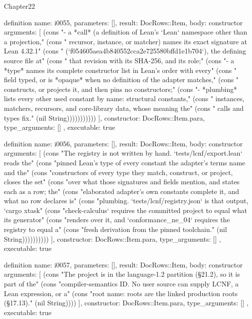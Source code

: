 \begin{lexlean}{Chapter22}
\begin{semanticmodule}
definition{
  name: i0055,
  parameters: [],
  result: DocRows::Item,
  body: constructor{
    arguments: [
      (cons "- a *call* (a definition of Lean's `Lean` namespace other than a projection," (cons "  recursor, instance, or matcher) names its exact signature at Lean 4.32.1" (cons "  (`f054605aea4b840552cca2e725580bffd1e1b704`), the defining source file at" (cons "  that revision with its SHA-256, and its role;" (cons "- a *type* names its complete constructor list in Lean's order with every" (cons "  field typed, or is *opaque* when no definition of the adapter matches," (cons "  constructs, or projects it, and then pins no constructors;" (cons "- *plumbing* lists every other used constant by name: structural constants," (cons "  instances, matchers, recursors, and core-library data, whose meaning the" (cons "  calls and types fix." (nil String)))))))))))
    ],
    constructor: DocRows::Item.para,
    type_arguments: []
  },
  executable: true
}

definition{
  name: i0056,
  parameters: [],
  result: DocRows::Item,
  body: constructor{
    arguments: [
      (cons "The registry is not written by hand. `tests/lcnf/export.lean` reads the" (cons "pinned Lean's type of every constant the adapter's terms name and the" (cons "constructors of every type they match, construct, or project, closes the set" (cons "over what those signatures and fields mention, and states each as a row; the" (cons "elaborated adapter's own constants complete it, and what no row declares is" (cons "plumbing. `tests/lcnf/registry.json` is that output, `cargo xtask" (cons "check-calculus` requires the committed project to equal what its generator" (cons "renders over it, and `conformance_ne_04` requires the registry to equal a" (cons "fresh derivation from the pinned toolchain." (nil String))))))))))
    ],
    constructor: DocRows::Item.para,
    type_arguments: []
  },
  executable: true
}

definition{
  name: i0057,
  parameters: [],
  result: DocRows::Item,
  body: constructor{
    arguments: [
      (cons "The project is in the language-1.2 partition (§21.2), so it is part of the" (cons "compiler-semantics ID. No user source can supply LCNF, a Lean expression, or a" (cons "root name: roots are the linked production roots (§17.13)." (nil String))))
    ],
    constructor: DocRows::Item.para,
    type_arguments: []
  },
  executable: true
}


\end{semanticmodule}
\end{lexlean}
